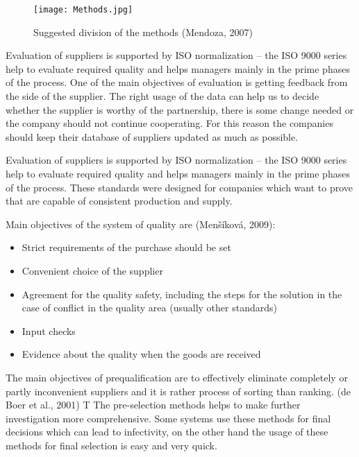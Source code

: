 \documentclass[oneside,12pt]{article}%
\begin{document}
\begin{figure}[ht!]
  \texttt{[image: Methods.jpg]}
  \caption{Suggested division of the methods (Mendoza, 2007)}
\end{figure}

Evaluation of suppliers is supported by ISO normalization – the ISO 9000 series help to evaluate required quality and helps managers mainly in the prime phases of the process.
One of the main objectives of evaluation is getting feedback from the side of the supplier. The right usage of the data can help us to decide whether the supplier is worthy of the partnership, there is some change needed or the company should not continue cooperating. For this reason the companies should keep their database of suppliers updated as much as possible.


Evaluation of suppliers is supported by ISO normalization – the ISO 9000 series help to evaluate required quality and helps managers mainly in the prime phases of the process. These standards were designed for companies which want to prove that are capable of consistent production and supply.

Main objectives of the system of quality are (Menšíková, 2009):
  \begin{itemize}
    \item Strict requirements of the purchase should be set
    \item Convenient choice of the supplier
    \item Agreement for the quality safety, including the steps for the solution in the case of conflict in the quality area (usually other standards)
    \item Input checks
    \item Evidence about the quality when the goods are received
  \end{itemize}

The main objectives of prequalification are to effectively eliminate completely or partly inconvenient suppliers and it is rather process of sorting than ranking. (de Boer et al., 2001) T The pre-selection methods helps to make further investigation more comprehensive. Some systems use these methods for final decisions which can lead to infectivity, on the other hand the usage of these methods for final selection is easy and very quick.
\end{document}
